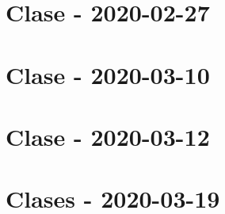 \documentclass[openany]{book}
\begin{document}
\chapter{Clase - 2020-02-27}


\chapter{Clase - 2020-03-10}


\chapter{Clase - 2020-03-12}


\chapter{Clases - 2020-03-19}

\end{document}
